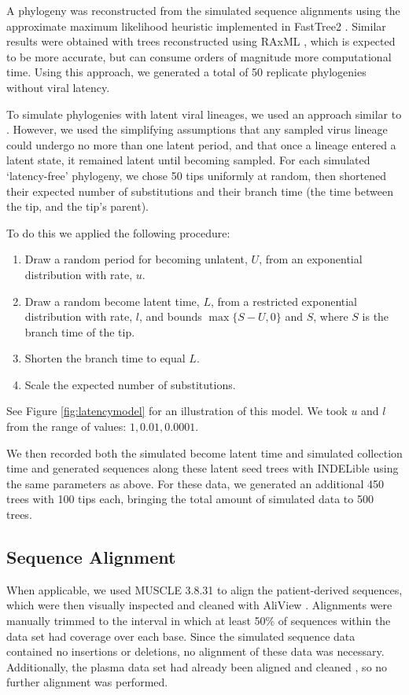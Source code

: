 \documentclass[12pt]{article}
\begin{document}
A phylogeny was reconstructed from the simulated sequence alignments using the approximate maximum likelihood heuristic implemented in FastTree2 \citep{FastTree10}.
Similar results were obtained with trees reconstructed using RAxML \citep{Raxml14}, which is expected to be more accurate, but can consume orders of magnitude more computational time.
Using this approach, we generated a total of 50 replicate phylogenies without viral latency. 

To simulate phylogenies with latent viral lineages, we used an approach similar to  \citet{Immonen14}. 
However, we used the simplifying assumptions that any sampled virus lineage could undergo no more than one latent period, and that once a lineage entered a latent state, it remained latent until becoming sampled.
For each simulated `latency-free' phylogeny, we chose 50 tips uniformly at random, then shortened their expected number of substitutions and their branch time (the time between the tip, and the tip's parent).

To do this we applied the following procedure:
\begin{enumerate}
\item Draw a random period for becoming unlatent, $U$, from an exponential distribution with rate, $u$.
\item Draw a random become latent time, $L$, from a restricted exponential distribution with rate, $l$, and bounds $\max\{S-U, 0\}$ and $S$, where $S$ is the branch time of the tip.
\item Shorten the branch time to equal $L$.
\item Scale the expected number of substitutions.
\end{enumerate}
See Figure \ref{fig:latencymodel} for an illustration of this model. We took $u$ and $l$ from the range of values: $1, 0.01, 0.0001$.

We then recorded both the simulated become latent time and simulated collection time and generated sequences along these latent seed trees with INDELible using the same parameters as above. 
For these data, we generated an additional 450 trees with 100 tips each, bringing the total amount of simulated data to 500 trees.


\subsection * {Sequence Alignment} \label{subsec:seqalign}
When applicable, we used MUSCLE 3.8.31 \citep{Muscle04} to align the patient-derived sequences, which were then visually inspected and cleaned with AliView \citep{AliView14}. 
Alignments were manually trimmed to the interval in which at least  50\% of sequences within the data set had coverage over each base.
Since the simulated sequence data contained no insertions or deletions, no alignment of these data was necessary. 
Additionally, the plasma data set had already been aligned and cleaned \citep{McCloskey14}, so no further alignment was performed.
\end{document}
